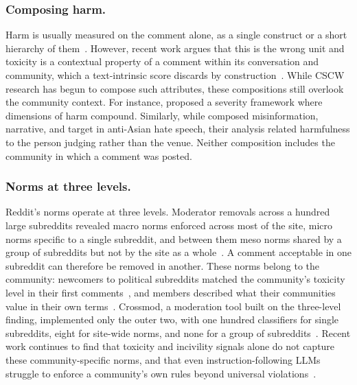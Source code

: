 \subsubsection{Composing harm.}

Harm is usually measured on the comment alone, as a single construct or a short hierarchy of them~\cite{zampieri2019olid,elsherief2021latenthatred,hartmann2025lostmoderation}. However, recent work argues that this is the wrong unit and toxicity is a contextual property of a comment within its conversation and community, which a text-intrinsic score discards by construction~\cite{berezin2025contextualharm,hartmann2026byebye}. While CSCW research has begun to compose such attributes, these compositions still overlook the community context. For instance, \citet{scheuerman2021severity} proposed a severity framework where dimensions of harm compound. Similarly, while \citet{zhou2025harm} composed misinformation, narrative, and target in anti-Asian hate speech, their analysis related harmfulness to the person judging rather than the venue. Neither composition includes the community in which a comment was posted.

\subsubsection{Norms at three levels.}

Reddit's norms operate at three levels. Moderator removals across a hundred large subreddits revealed macro norms enforced across most of the site, micro norms specific to a single subreddit, and between them meso norms shared by a group of subreddits but not by the site as a whole~\cite{chandrasekharan2018hiddenrules,singhal2023sok}. A comment acceptable in one subreddit can therefore be removed in another. These norms belong to the community: newcomers to political subreddits matched the community's toxicity level in their first comments~\cite{rajadesingan2020norms}, and members described what their communities value in their own terms~\cite{weld2024values}. Crossmod, a moderation tool built on the three-level finding, implemented only the outer two, with one hundred classifiers for single subreddits, eight for site-wide norms, and none for a group of subreddits~\cite{chandrasekharan2019crossmod}. Recent work continues to find that toxicity and incivility signals alone do not capture these community-specific norms, and that even instruction-following LLMs struggle to enforce a community's own rules beyond universal violations~\cite{xin2024communityrules,kim2025rulebook}. 

